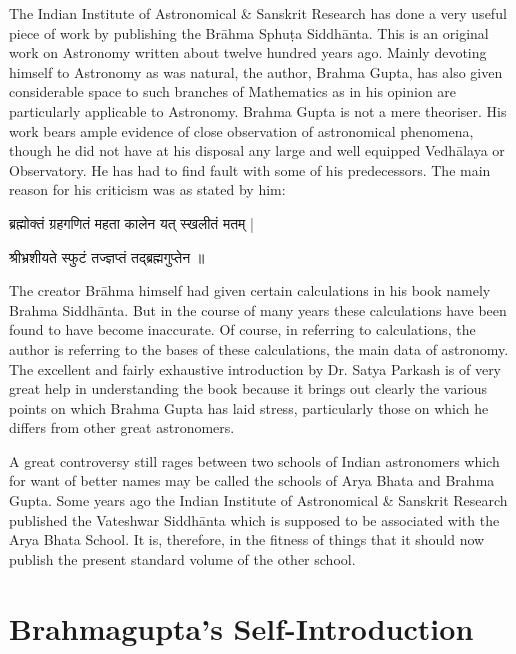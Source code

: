 \documentclass[11pt,a4paper]{article}
\begin{document}
The Indian Institute of Astronomical \& Sanskrit Research has done a very useful piece of work by publishing the Br\=ahma Sphu\d ta Siddh\=anta. This is an original work on Astronomy written about twelve hundred years ago. Mainly devoting himself to Astronomy as was natural, the author, Brahma Gupta, has also given considerable space to such branches of Mathematics as in his opinion are particularly applicable to Astronomy. Brahma Gupta is not a mere theoriser. His work bears ample evidence of close observation of astronomical phenomena, though he did not have at his disposal any large and well equipped Vedh\=alaya or Observatory. He has had to find fault with some of his predecessors. The main reason for his criticism was as stated by him:

{\devanagarifont ब्रह्मोक्तं ग्रहगणितं महता कालेन यत् स्खलीतं मतम् |\par}
{\devanagarifont श्रीभ्रशीयते स्फुटं तज्ज्ञप्तं तद्ब्रह्मगुप्तेन ॥\par}

The creator Br\=ahma himself had given certain calculations in his book namely Brahma Siddh\=anta. But in the course of many years these calculations have been found to have become inaccurate. Of course, in referring to calculations, the author is referring to the bases of these calculations, the main data of astronomy. The excellent and fairly exhaustive introduction by Dr. Satya Parkash is of very great help in understanding the book because it brings out clearly the various points on which Brahma Gupta has laid stress, particularly those on which he differs from other great astronomers.

A great controversy still rages between two schools of Indian astronomers which for want of better names may be called the schools of Arya Bhata and Brahma Gupta. Some years ago the Indian Institute of Astronomical \& Sanskrit Research published the Vateshwar Siddh\=anta which is supposed to be associated with the Arya Bhata School. It is, therefore, in the fitness of things that it should now publish the present standard volume of the other school.

\clearpage

\section*{Brahmagupta's Self-Introduction}
\end{document}
